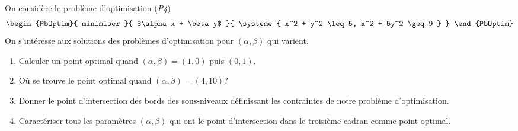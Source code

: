\documentclass[11pt, a4paper]{article}
\begin{document}
\noindent On considère le problème d'optimisation (\emph{P4})
\[
\begin{PbOptim}{
    minimiser
  }{
    $\alpha x + \beta y$
  }{
    \systeme{
      x^2 + y^2 \leq 5,
      x^2 + 5y^2 \geq 9
    }
  }
\end{PbOptim}
\]
On s'intéresse aux solutions des problèmes d'optimisation pour
$(\alpha, \beta)$ qui varient.
\begin{question}{4}
  \begin{enumerate}
  \item Calculer un point optimal quand $(\alpha, \beta) = (1, 0)$
    puis $(0, 1)$.
  \item Où se trouve le point optimal quand
    $(\alpha, \beta) = (4, 10)$?
  \item Donner le point d'intersection des bords des sous-niveaux
    définissant les contraintes de notre problème d'optimisation.
  \item Caractériser tous les paramètres $(\alpha, \beta)$ qui ont le
    point d'intersection dans le troisième cadran comme point optimal.
  \end{enumerate}
\end{question}
\end{document}
